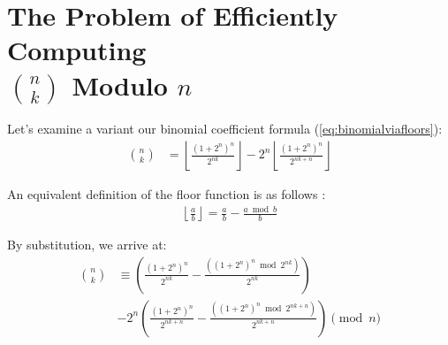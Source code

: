 \documentclass{article}
\theoremstyle{plain}
\theoremstyle{definition}
\begin{document}
\section[The Problem of Efficiently Computing n choose k Modulo n]{The Problem of Efficiently Computing\\ \( \binom{n}{k} \) Modulo \( n \)}

Let's examine a variant our binomial coefficient formula (\ref{eq:binomialviafloors}):
\begin{align*}
    \binom{n}{k} &= \left\lfloor\frac{(1 + 2^{n})^{n}}{2^{n k}}\right\rfloor - 2^{n} \left\lfloor \frac{(1 + 2^{n})^{n}}{2^{n k + n}} \right\rfloor
\end{align*}

An equivalent definition of the floor function is as follows \cite{niven2008introduction}:
\begin{align}
    \left\lfloor \frac{a}{b} \right\rfloor = \frac{a}{b} - \frac{a \bmod{b}}{b}
\end{align}

By substitution, we arrive at:
\begin{align*}
    \binom{n}{k} &\equiv \left(\frac{(1 + 2^{n})^{n}}{2^{nk}} - \frac{((1 + 2^{n})^{n} \bmod{2^{nk}})}{2^{nk}}\right)\\&- 2^{n} \left( \frac{(1 + 2^{n})^{n}}{2^{nk+n}} - \frac{((1 + 2^{n})^{n} \bmod{2^{nk+n}})}{2^{nk+n}} \right) \pmod{n}
\end{align*}
\end{document}

